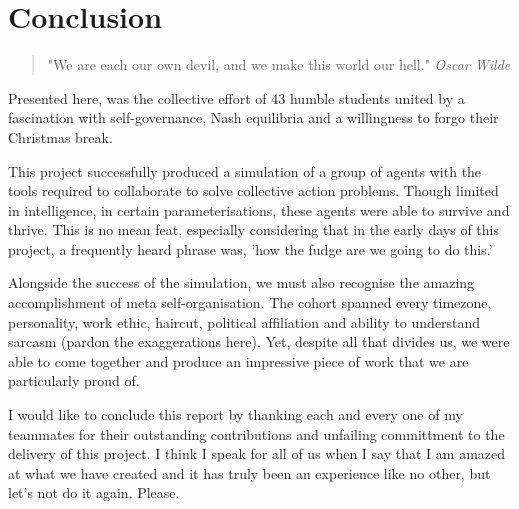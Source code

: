 \chapter{Conclusion}


\begin{flushleft}
    \begin{quote}
        "We are each our own devil, and we make this world our hell."
        \linebreak
        \emph{Oscar Wilde}
    \end{quote}
\end{flushleft}

Presented here, was the collective effort of 43 humble students united by a fascination with self-governance, Nash equilibria and a willingness to forgo their Christmas break. 

This project successfully produced a simulation of a group of agents with the tools required to collaborate to solve collective action problems. Though limited in intelligence, in certain parameterisations, these agents were able to survive and thrive. This is no mean feat, especially considering that in the early days of this project, a frequently heard phrase was, 'how the fudge are we going to do this.'

Alongside the success of the simulation, we must also recognise the amazing accomplishment of meta self-organisation. The cohort spanned every timezone, personality, work ethic, haircut, political affiliation and ability to understand sarcasm (pardon the exaggerations here). Yet, despite all that divides us, we were able to come together and produce an impressive piece of work that we are particularly proud of. 

I would like to conclude this report by thanking each and every one of my teammates for their outstanding contributions and unfailing committment to the delivery of this project. I think I speak for all of us when I say that I am amazed at what we have created and it has truly been an experience like no other, but let's not do it again. Please.